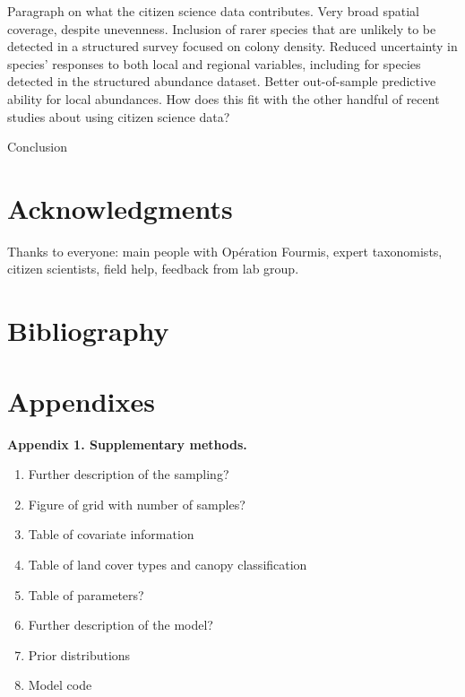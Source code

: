 \documentclass[preprint,review,times,12pt]{elsarticle}
\begin{document}
Paragraph on what the citizen science data contributes. Very broad spatial coverage, despite unevenness. Inclusion of rarer species that are unlikely to be detected in a structured survey focused on colony density. Reduced uncertainty in species' responses to both local and regional variables, including for species detected in the structured abundance dataset. Better out-of-sample predictive ability for local abundances. How does this fit with the other handful of recent studies about using citizen science data?

Conclusion



\section{Acknowledgments}
Thanks to everyone: main people with Opération Fourmis, expert taxonomists, citizen scientists, field help, feedback from lab group.

\newpage
\section{Bibliography}




\newpage
\section{Appendixes}
\textbf{Appendix 1. Supplementary methods.}
\begin{enumerate}
    \item Further description of the sampling?
    \item Figure of grid with number of samples?
    \item Table of covariate information
    \item Table of land cover types and canopy classification
    \item Table of parameters?
    \item Further description of the model?
    \item Prior distributions
    \item Model code
\end{enumerate}
\end{document}
